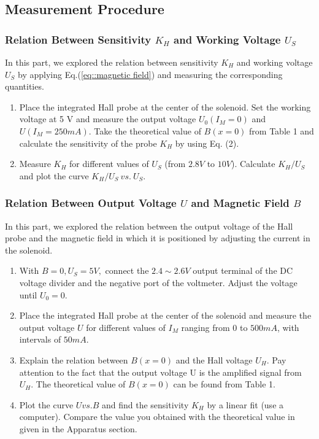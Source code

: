 \documentclass[a4paper]{article}
\begin{document}
\subsection{Measurement Procedure}

\subsubsection{Relation Between Sensitivity $ K_H $ and Working Voltage $ U_S $}
In this part, we explored the relation between sensitivity $K_{H}$ and working voltage $U_{S}$ by applying Eq.(\ref{eq::magnetic field}) and measuring the corresponding
quantities.
\begin{enumerate}
	\item Place the integrated Hall probe at the center of the solenoid. Set the working voltage at 5 V and measure the output voltage $ U_0 (I_M = 0) $ and
	      $ U (I_M = 250 mA) $. Take the theoretical value of $ B(x = 0) $ from Table 1 and calculate the sensitivity of the probe $ K_H $ by using Eq. (2).
	\item Measure $ K_H $ for different values of $ U_S $ (from $ 2.8 V $ to $ 10 V $). Calculate $ K_H/U_S $ and plot the curve $ K_H/U_S\ vs.\ U_S $.
\end{enumerate}
\subsubsection{Relation Between Output Voltage $ U $ and Magnetic Field $ B $}
In this part, we explored the relation between the output voltage of the Hall probe and the magnetic field in which it is positioned by adjusting the current in the
solenoid.
\begin{enumerate}
	\item With $ B=0, U_S=5 V, $ connect the $ 2.4 \sim 2.6 V $ output terminal of the DC voltage divider and the negative port of the voltmeter. Adjust the voltage
	      until $ U_0 = 0 $.
	\item Place the integrated Hall probe at the center of the solenoid and measure the output voltage $ U $ for different values of $ I_M $ ranging from 0 to
	      $ 500 mA $, with intervals of $ 50 mA $.
	\item Explain the relation between $ B(x = 0) $ and the Hall voltage $ U_H $. Pay attention to the fact that the output voltage U is the amplified signal from
	      $ U_H $. The theoretical value of $ B(x = 0) $ can be found from Table 1.
	\item Plot the curve $ U vs. B $ and find the sensitivity $ K_H $ by a linear fit (use a computer). Compare the value you obtained with the theoretical value in
	      given in the Apparatus section.
\end{enumerate}
\end{document}
